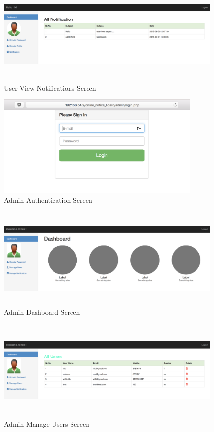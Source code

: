 \documentclass[12pt,a4paper]{article}
\begin{document}
    \begin{figure}[H]
    	\centering
    	\includegraphics[width=\textwidth,height=2in]{figures/user_view_notification.png}
    	\caption{User View Notifications Screen}
    \end{figure}
    
     \begin{figure}[H]
    	\centering
    	\includegraphics[width=\textwidth,height=2in]{figures/admin_login.png}
    	\caption{Admin Authentication Screen}
    \end{figure}
    
    \begin{figure}[H]
    	\centering
    	\includegraphics[width=\textwidth,height=2in]{figures/admin_dashboard.png}
    	\caption{Admin Dashboard Screen}
    \end{figure}
    
    \begin{figure}[H]
    	\centering
    	\includegraphics[width=\textwidth,height=2in]{figures/admin_manage_users.png}
    	\caption{Admin Manage Users Screen}
    \end{figure}
    
\end{document}
